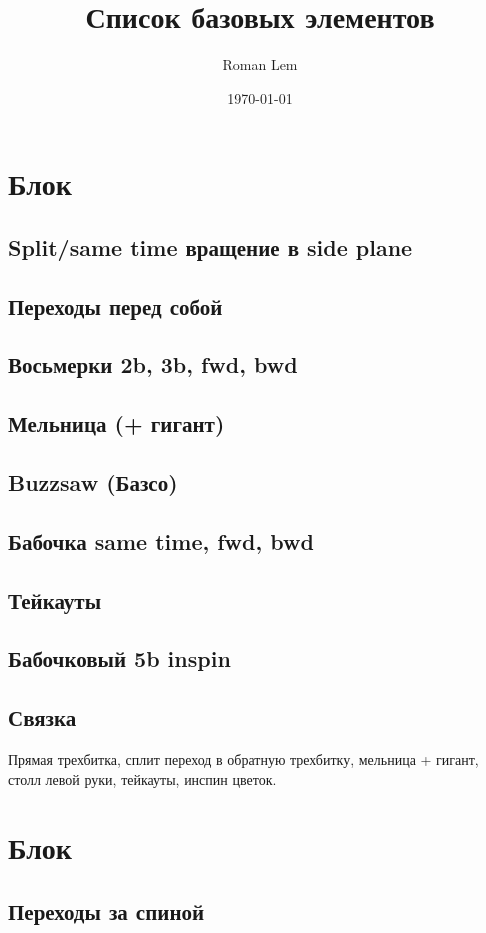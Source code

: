 \documentclass[a4paper, 12pt]{article}
\title{Список базовых элементов}
\author{Roman Lem}
\date{\today}
\begin{document}
	\maketitle
	\section{Блок}
	
	\subsection{Split/same time вращение в side plane}
	\subsection{Переходы перед собой}
	\subsection{Восьмерки 2b, 3b, fwd, bwd}
	\subsection{Мельница (+ гигант)}
	\subsection{Buzzsaw (Базсо)}
	\subsection{Бабочка same time, fwd, bwd}
	\subsection{Тейкауты}
	\subsection{Бабочковый 5b inspin}
	\subsection{Связка}
	
	Прямая трехбитка, сплит переход в обратную трехбитку, мельница + гигант, столл левой руки, тейкауты, инспин цветок.
	
	\section{Блок}
	
	\subsection{Переходы за спиной}
\end{document}
